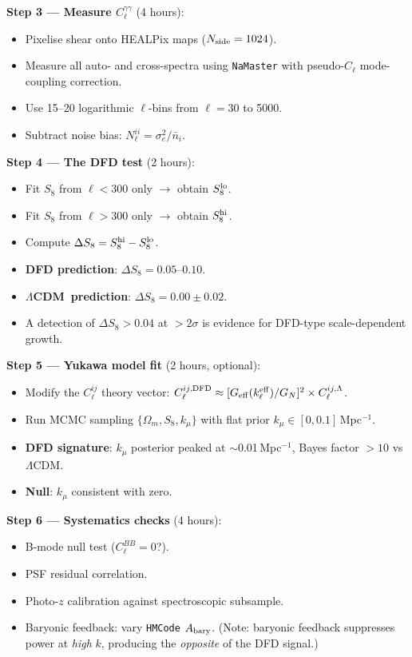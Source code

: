 \documentclass[11pt,a4paper]{article}
\newcommand{\LCDM}{$\Lambda$CDM}
\newcommand{\kmu}{k_\mu}
\newcommand{\Geff}{G_{\rm eff}}
\begin{document}
\begin{pipelinebox}
\textbf{Step 3 --- Measure $C_\ell^{\gamma\gamma}$} (4 hours):
\begin{itemize}[nosep]
\item Pixelise shear onto HEALPix maps ($N_{\rm side} = 1024$).
\item Measure all auto- and cross-spectra using \texttt{NaMaster}
  with pseudo-$C_\ell$ mode-coupling correction.
\item Use 15--20 logarithmic $\ell$-bins from $\ell = 30$ to 5000.
\item Subtract noise bias: $N_\ell^{ii} = \sigma_e^2/\bar{n}_i$.
\end{itemize}

\textbf{Step 4 --- The DFD test} (2 hours):
\begin{itemize}[nosep]
\item Fit $S_8$ from $\ell < 300$ only $\to$ obtain $S_8^{\rm lo}$.
\item Fit $S_8$ from $\ell > 300$ only $\to$ obtain $S_8^{\rm hi}$.
\item Compute $\Delta S_8 = S_8^{\rm hi} - S_8^{\rm lo}$.
\item \textbf{DFD prediction}: $\Delta S_8 = 0.05$--$0.10$.
\item \textbf{\LCDM\ prediction}: $\Delta S_8 = 0.00 \pm 0.02$.
\item A detection of $\Delta S_8 > 0.04$ at $>2\sigma$ is evidence
  for DFD-type scale-dependent growth.
\end{itemize}

\textbf{Step 5 --- Yukawa model fit} (2 hours, optional):
\begin{itemize}[nosep]
\item Modify the $C_\ell^{ij}$ theory vector:
  $C_\ell^{ij,\rm DFD} \approx [\Geff(k_\ell^{\rm eff})/G_N]^2
  \times C_\ell^{ij,\Lambda}$.
\item Run MCMC sampling $\{\Omega_m, S_8, \kmu\}$ with flat prior
  $\kmu \in [0, 0.1]$\,Mpc$^{-1}$.
\item \textbf{DFD signature}: $\kmu$ posterior peaked at
  $\sim$0.01\,Mpc$^{-1}$, Bayes factor $> 10$ vs \LCDM.
\item \textbf{Null}: $\kmu$ consistent with zero.
\end{itemize}

\textbf{Step 6 --- Systematics checks} (4 hours):
\begin{itemize}[nosep]
\item B-mode null test ($C_\ell^{BB} = 0$?).
\item PSF residual correlation.
\item Photo-$z$ calibration against spectroscopic subsample.
\item Baryonic feedback: vary \texttt{HMCode} $A_{\rm bary}$.
  (Note: baryonic feedback suppresses power at \emph{high} $k$,
  producing the \emph{opposite} of the DFD signal.)
\end{itemize}


\end{pipelinebox}
\end{document}
